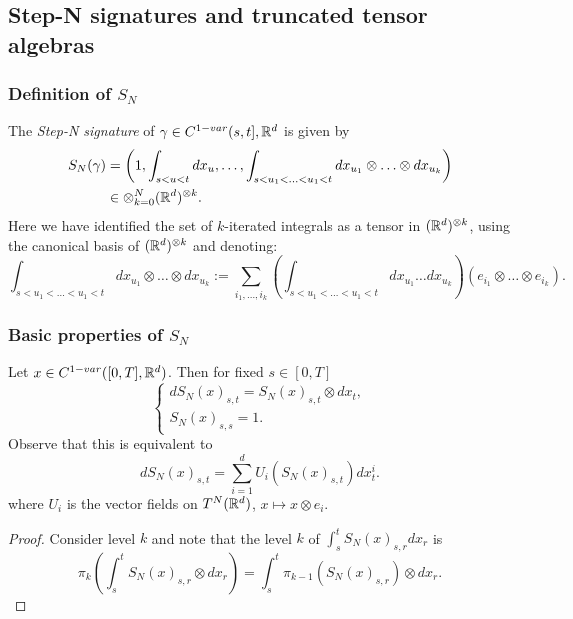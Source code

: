 \subsection{Step-N signatures and truncated tensor algebras}

\subsubsection{Definition of \(S_N\)}

\begin{definition}
    The \textit{Step-N signature} of \(\gamma \in C^{1-var}(s,t],\mathbb{R}^d\) is given by
    \begin{align}
        S_N(\gamma) &= \left( 1, \int_{s<u<t} dx_u, \ldots, \int_{s < u_1 < \ldots < u_1 <t} dx_{u_1} \otimes \ldots \otimes dx_{u_k} \right) \\
        &\in \otimes_{k=0}^N (\mathbb{R}^d)^{\otimes k}.
    \end{align}  
    Here we have identified the set of \(k\)-iterated integrals as a tensor in \((\mathbb{R}^d)^{\otimes k}\), using the canonical basis of \((\mathbb{R}^d)^{\otimes k}\) and denoting:
    \begin{equation}
        \int_{s < u_1 < \ldots < u_1 <t} dx_{u_1} \otimes \ldots \otimes dx_{u_k} := \sum_{i_1,\ldots,i_k} \left( \int_{s < u_1 < \ldots < u_1 <t} dx_{u_1} \ldots dx_{u_k} \right) (e_{i_1} \otimes \ldots \otimes e_{i_k}).
    \end{equation}
\end{definition}

\subsubsection{Basic properties of \(S_N\)}

\begin{proposition}
    Let \( x \in C^{1-var}([0,T],\mathbb{R}^d)\). Then for fixed \(s \in [0,T]\)
    \begin{equation}
        \begin{cases}
            dS_N(x)_{s,t} = S_N(x)_{s,t} \otimes dx_t, \\
            S_N(x)_{s,s} = 1.
        \end{cases}
    \end{equation}
    Observe that this is equivalent to 
    \begin{equation}
        dS_N(x)_{s,t} = \sum_{i=1}^d U_i\left(S_N(x)_{s,t}\right) dx^i_t.
    \end{equation}
    where \(U_i\) is the vector fields on \(T^N(\mathbb{R}^d)\), \(x \mapsto x \otimes e_i \).
\end{proposition}
\begin{proof}
    Consider level \(k\) and note that the level \(k\) of \(\int_s^t S_N(x)_{s,r} dx_r\) is
    \begin{equation}
        \pi_k \left( \int_s^t S_N(x)_{s,r} \otimes dx_r \right) = \int_s^t \pi_{k-1}(S_N(x)_{s,r}) \otimes dx_r.
    \end{equation}
\end{proof}


